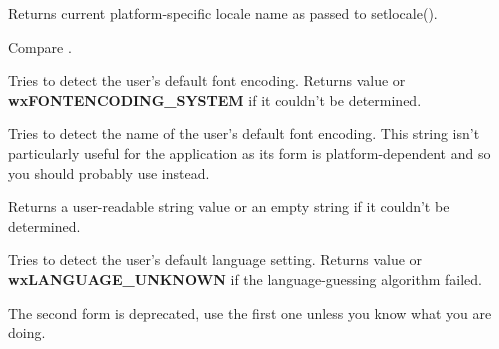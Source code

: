 
Returns current platform-specific locale name as passed to setlocale().

Compare .



\label{wxlocalegetsystemencoding}


Tries to detect the user's default font encoding.
Returns  value or 
{\bf wxFONTENCODING\_SYSTEM} if it couldn't be determined.


\label{wxlocalegetsystemencodingname}


Tries to detect the name of the user's default font encoding. This string isn't
particularly useful for the application as its form is platform-dependent and
so you should probably use 
 instead.

Returns a user-readable string value or an empty string if it couldn't be
determined.


\label{wxlocalegetsystemlanguage}


Tries to detect the user's default language setting.
Returns  value or 
 {\bf wxLANGUAGE\_UNKNOWN} if the language-guessing algorithm failed.



\label{wxlocaleinit}




The second form is deprecated, use the first one unless you know what you are
doing. 




